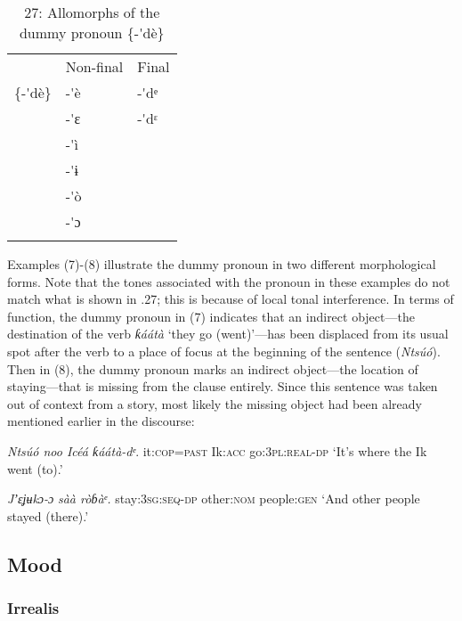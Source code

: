 \begin{table}
\begin{table}
\caption{27: Allomorphs of the dummy pronoun \{-\'{ }dè\}}
\label{tab:8}


\begin{tabularx}{\textwidth}{XXX} & Non-final & Final\\
\lsptoprule
\{-\'{ }dè\} & {}-\'{ }è & {}-\'{ }dᵉ\\
& {}-\'{ }ɛ & {}-\'{ }dᵋ\\
& {}-\'{ }ì & \\
& {}-\'{ }ɨ & \\
& {}-\'{ }ò & \\
& {}-\'{ }ɔ & \\
\lspbottomrule
\end{tabularx}
\end{table}
Examples (7)-(8) illustrate the dummy pronoun in two different morphological forms. Note that the tones associated with the pronoun in these examples do not match what is shown in .27; this is because of local tonal interference. In terms of function, the dummy pronoun in (7) indicates that an indirect object—the destination of the verb \textit{ƙáátà }‘they go (went)’—has been displaced from its usual spot after the verb to a place of focus at the beginning of the sentence (\textit{Ntsúó}). Then in (8), the dummy pronoun marks an indirect object—the location of staying—that is missing from the clause entirely. Since this sentence was taken out of context from a story, most likely the missing object had been already mentioned earlier in the discourse:




\textit{Ntsúó noo     Icéá     ƙáátà-}\textit{dᵉ}.
it:\textsc{cop}=\textsc{past}    Ik:\textsc{acc}   go:\textsc{3pl:real-dp}
‘It’s where the Ik went (to).’




\textit{Jʼɛʝʉkɔ-}\textit{ɔ}\textit{     sàà     ròɓàᵉ.}
stay:\textsc{3sg:seq-dp}   other:\textsc{nom}   people:\textsc{gen}
‘And other people stayed (there).’






\subsection{Mood}
\subsubsection{Irrealis}


\end{table}
